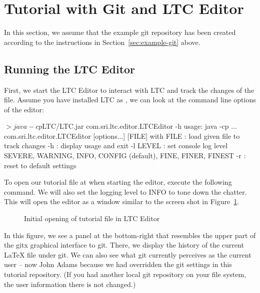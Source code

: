 \section{Tutorial with Git and LTC Editor} \label{sec:tutorial-git}

In this section, we assume that the example git repository has been created according to the instructions in Section~\ref{sec:example-git} above.

\subsection{Running the LTC Editor}

First, we start the LTC Editor to interact with LTC and track the changes of the file.  Assume you have installed LTC as , we can look at the command line options of the editor:
\begin{CodeVerbatim}[commandchars=\\\{\}]
$> java -cp $LTC/LTC.jar com.sri.ltc.editor.LTCEditor -h
usage: java -cp ... com.sri.ltc.editor.LTCEditor [options...] [FILE] 
with
 FILE     : load given file to track changes
 -h       : display usage and exit
 -l LEVEL : set console log level
            SEVERE, WARNING, INFO, CONFIG (default), FINE, FINER, FINEST
 -r       : reset to default settings
\end{CodeVerbatim}

To open our tutorial file at  when starting the editor, execute the following command.  We will also set the logging level to INFO to tone down the chatter.  This will open the editor as a window similar to the screen shot in Figure~\ref{fig:editor-open}.
\begin{figure}[t]
\centering
{}
\caption{Initial opening of tutorial file in LTC Editor} \label{fig:editor-open}
\end{figure}
In this figure, we see a panel at the bottom-right that resembles the upper part of the gitx graphical interface to git.  There, we display the history of the current LaTeX file under git.  We can also see what git currently perceives as the current user -- now John Adams because we had overridden the git settings in this tutorial repository.  (If you had another local git repository on your file system, the user information there is not changed.)

